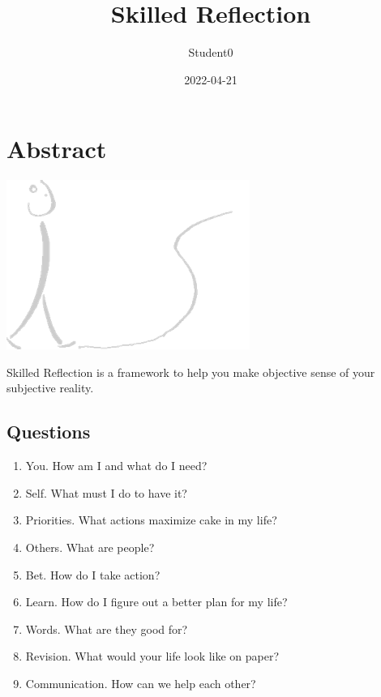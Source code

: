 \documentclass[
]{book}
\title{Skilled Reflection}
\author{Student0}
\date{2022-04-21}
\providecommand{\tightlist}{%
  \setlength{\itemsep}{0pt}\setlength{\parskip}{0pt}}
\begin{document}
\maketitle

{
\setcounter{tocdepth}{1}
\tableofcontents
}
\hypertarget{abstract}{%
\chapter*{Abstract}\label{abstract}}

\includegraphics{../figs/sr_gray_transp.png}

Skilled Reflection is a framework to help you make objective sense of your subjective reality.

\hypertarget{questions}{%
\section{Questions}\label{questions}}

\begin{enumerate}
\def\labelenumi{\arabic{enumi}.}
\tightlist
\item
  You. How am I and what do I need?
\item
  Self. What must I do to have it?
\item
  Priorities. What actions maximize cake in my life?\\
\item
  Others. What are people?\\
\item
  Bet. How do I take action?\\
\item
  Learn. How do I figure out a better plan for my life?\\
\item
  Words. What are they good for?\\
\item
  Revision. What would your life look like on paper?
\item
  Communication. How can we help each other?
\end{enumerate}
\end{document}
